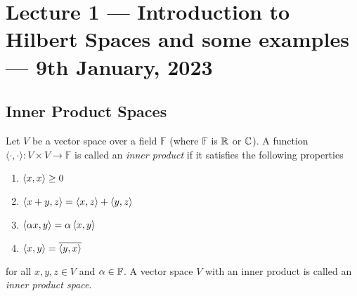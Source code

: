 \section{Lecture 1  --- Introduction to Hilbert Spaces and some examples --- 9th January, 2023}

\subsection{Inner Product Spaces}
\begin{definition}
    Let $V$ be a vector space over a field $\mathbb F$ (where $\mathbb F$ is $\mathbb R$ or $\mathbb C$). A function $\langle \cdot , \cdot \rangle : V \times V \to \mathbb F$ is called an \textit{inner product} if it satisfies the following properties
    \begin{enumerate}
	\item $\left\langle x, x \right\rangle \ge 0$
	\item $\left\langle x+y, z \right\rangle = \left\langle x, z \right\rangle + \left\langle y, z \right\rangle$
	\item $\left\langle \alpha x, y \right\rangle = \alpha \left\langle x, y \right\rangle$
	\item $\left\langle x, y \right\rangle = \overline{\left\langle y, x \right\rangle}$
    \end{enumerate}
    for all $x,y,z \in V$ and $\alpha \in \mathbb F$. A vector space $V$ with an inner product is called an \textit{inner product space}.
    \label{def:inner-product}
\end{definition}


